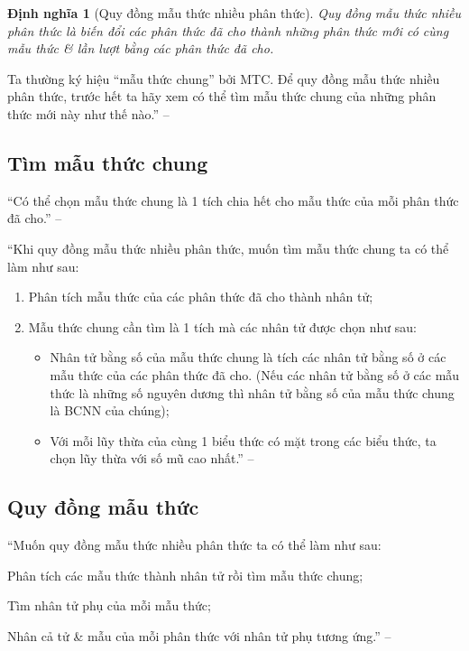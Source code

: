 \documentclass[oneside]{book}
\numberwithin{equation}{section}
\newtheorem{dinhnghia}{Định nghĩa}[section]
\begin{document}
\begin{dinhnghia}[Quy đồng mẫu thức nhiều phân thức]
	\emph{Quy đồng mẫu thức nhiều phân thức} là biến đổi các phân thức đã cho thành những phân thức mới có cùng mẫu thức \& lần lượt bằng các phân thức đã cho.
\end{dinhnghia}
Ta thường ký hiệu ``mẫu thức chung'' bởi MTC. Để quy đồng mẫu thức nhiều phân thức, trước hết ta hãy xem có thể tìm mẫu thức chung của những phân thức mới này như thế nào.'' -- \cite[p. 41]{SGK_Toan_8_tap_1}

\subsection{Tìm mẫu thức chung}
``Có thể chọn mẫu thức chung là 1 tích chia hết cho mẫu thức của mỗi phân thức đã cho.'' -- \cite[p. 41]{SGK_Toan_8_tap_1}

``Khi quy đồng mẫu thức nhiều phân thức, muốn tìm mẫu thức chung ta có thể làm như sau: 
\begin{enumerate}
	\item Phân tích mẫu thức của các phân thức đã cho thành nhân tử;
	\item Mẫu thức chung cần tìm là 1 tích mà các nhân tử được chọn như sau:
	\begin{itemize}
		\item Nhân tử bằng số của mẫu thức chung là tích các nhân tử bằng số ở các mẫu thức của các phân thức đã cho. (Nếu các nhân tử bằng số ở các mẫu thức là những số nguyên dương thì nhân tử bằng số của mẫu thức chung là BCNN của chúng);
		\item Với mỗi lũy thừa của cùng 1 biểu thức có mặt trong các biểu thức, ta chọn lũy thừa với số mũ cao nhất.'' -- \cite[p. 42]{SGK_Toan_8_tap_1}		
	\end{itemize}
\end{enumerate}

\subsection{Quy đồng mẫu thức}
``Muốn quy đồng mẫu thức nhiều phân thức ta có thể làm như sau:
\begin{enumerate*}
	\item Phân tích các mẫu thức thành nhân tử rồi tìm mẫu thức chung;
	\item Tìm nhân tử phụ của mỗi mẫu thức;
	\item Nhân cả tử \& mẫu của mỗi phân thức với nhân tử phụ tương ứng.'' -- \cite[p. 42]{SGK_Toan_8_tap_1}
\end{enumerate*}
\end{document}
